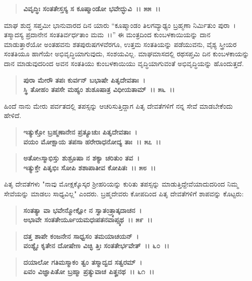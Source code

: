 \begin{verse}
\textbf{ವಿವೃದ್ಧಿಃ ಸಂತತೇಸ್ತಸ್ಯ ಸ ಕೂಷ್ಮಾಂಡೋ ಭವೇದ್ಭುವಿ~।। ೫೫~।।}
\end{verse}

ಮಾಘ ಶುದ್ಧ ಸಪ್ತಮೀ ಭಾನುವಾರದ ದಿನ ಯಾರು “ಕೂಷ್ಮಾಂಡಂ ತಿಲಗವ್ಯಾಢ್ಯಂ ಬ್ರಹ್ಮಣಾ ನಿರ್ಮಿತುಂ ಪುರಾ~। ತಸ್ಮಾದಸ್ಯ ಪ್ರದಾನೇನ ಸಂತತಿರ್ವರ್ಧತಾಂ ಮಮ~।।” ಈ ಮಂತ್ರದಿಂದ ಕುಂಬಳಕಾಯಿಯನ್ನು ದಾನ ಮಾಡುತ್ತಾರೆಯೋ ಅಂತಹವನು ಶತಪುರುಷಗಳವೆರಗೂ, ಉತ್ತಮ ಸಂತತಿಯನ್ನು ಪಡೆಯುವನು, ವೈಶ್ಯ ಸ್ತ್ರೀಯರ ಸಂತತಿಯೂ ಹಾಗೆಯೇ ಅಭಿವೃದ್ಧಿಯಾಗುವುದು, ಸಂಶಯವಿಲ್ಲ. ಮಾಘಮಾಸದಲ್ಲಿ ರಥಸಪ್ತಮಿ ದಿನ ಕುಂಬಳ\-ಕಾಯನ್ನು ದಾನ ಮಾಡುವುದರಿಂದ ಅವನ ಸಂತತಿಯು ಕುಂಬಳಕಾಯಿಯು ವೃದ್ಧಿಯಾಗುವಂತೆ ಅಭಿವೃದ್ಧಿಯನ್ನು ಹೊಂದುತ್ತದೆ.

\begin{verse}
\textbf{ಪುರಾ ಮೇರೌ ತಪಃ ಕುರ್ವನ್ ಬಭಾಷೇ ಪಿತೃದೇವತಾಃ~।}\\\textbf{ಸ್ಥಿ ತೋಹಂ ತಪಸೇ ಮಹ್ಯಂ ಶುಶೂಷಾತ್ರ ವಿಧೀಯತಾಮ್~।। ೫೬~।।}
\end{verse}

ಹಿಂದೆ ನಾನು ಮೇರು ಪರ್ವತದಲ್ಲಿ ತಪಸ್ಸನ್ನು ಆಚರಿಸುತ್ತಿದ್ದಾಗ ಪಿತೃ ದೇವತೆಗಳಿಗೆ ನನ್ನ ಸೇವೆ ಮಾಡಬೇಕೆಂದು ಹೇಳಿದೆ.

\begin{verse}
\textbf{ಇತ್ಯುಕ್ತೋ ಬ್ರಹ್ಮಣಾನೇನ ಪ್ರತ್ಯೂಚುಃ ಪಿತೃದೇವತಾಃ~।}\\\textbf{ವಯಂ ಮೋಕ್ಷಾಯ ತಪಸಾ ಹರೇರಾಧನೋದ್ಯ ತಾಃ~।। ೫೭~।।}
\end{verse}

\begin{verse}
\textbf{ಅತೋsಸ್ಮಾಭಿಸ್ತು ಶುಶ್ರೂಷಾ ನ ಶಕ್ಯಾ ಚರಿತುಂ ತವ~।}\\\textbf{ಇತ್ಯುಕ್ತೇ ಪಿತೃಭಿಃ ಸೋಪಿ ಶಶಾಪಾತೀವ ಕೋಪಿತಃ~।। ೫೮~।।}
\end{verse}

ಪಿತೃ ದೇವತೆಗಳು "ನಾವು ಮೋಕ್ಷಕ್ಕೊಸ್ಕರ ಶ‍್ರೀಹರಿಯನ್ನು ಕುರಿತು ತಪಸ್ಸನ್ನು ಮಾಡುತ್ತಿದ್ದೇವೆಯಾದುದರಿಂದ ನಿಮ್ಮ ಸೇವೆಯನ್ನು ಮಾಡಲು ಸಾಧ್ಯವಿಲ್ಲ" ಎಂದರು. ಬ್ರಹ್ಮದೇವರು ಕೋಪದಿಂದ ಪಿತೃ ದೇವತೆಗಳಿಗೆ ಶಾಪವನ್ನು ಕೊಟ್ಟರು:

\begin{verse}
\textbf{ಸಂತತ್ಯಾ ವಾ ಭವೇನ್ಮೋಕ್ಷೋ ನ ಸ್ವಾತಂತ್ರ್ಯಾತ್ಕದಾಚನ~।}\\\textbf{ಅಭಾವೇ ಸಂತತೇರ್ಯೂಯಮಧಃಪತನವಾಪ್ಸ್ಯಥ~।। ೫೯~।। }
\end{verse}

\begin{verse}
\textbf{ದತ್ತ ಶಾಪೇ ಕಂಜನೇನ ಸಾಧ್ವಸಂ ತಮಯಾಚಯನ್~।}\\\textbf{ವಂಶ್ಯೈಃ ಕೃತೇನ ದೋಷೇಣ ವಿಚ್ಛಿ ತ್ತಿಃ ಸಂತತೇರ್ಭವೇತ್~।। ೬೦~।। }
\end{verse}

\begin{verse}
\textbf{ದಯಾಲೋ ಗತಿಮಸ್ಮಾಕಂ ತ್ವಂ ತಸ್ಮಾದ್ವದ ಸತ್ವರಮ್~।}\\\textbf{ಏವಂ ವಿಜ್ಞಾಪಿತೋ ಬ್ರಹ್ಮಾ ಪ್ರತ್ಯುವಾಚ ಪಿತೄನಥ~।। ೬೧~।।}
\end{verse}

